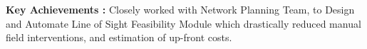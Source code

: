 \textbf{Key Achievements :} Closely worked with Network Planning Team, to Design and Automate Line of Sight Feasibility Module which drastically reduced manual field interventions, and estimation of up-front costs.

